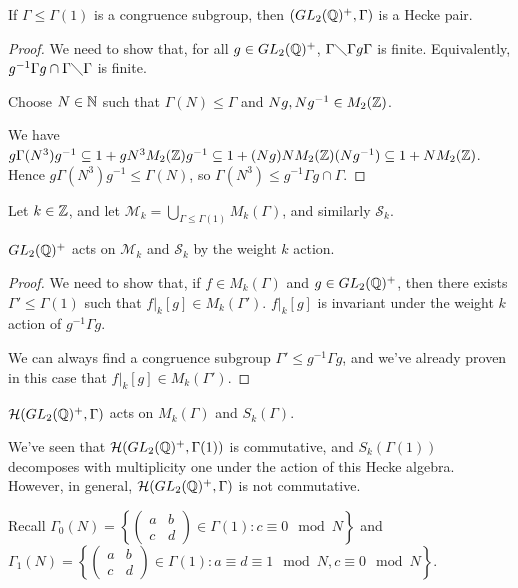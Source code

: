 \documentclass[10pt,a4paper]{article}
\begin{document}
\begin{lemma}
  If $\Gamma \leq \Gamma(1)$ is a congruence subgroup, then $(GL_2(\mathbb{Q})^+, \Gamma)$ is a Hecke pair.
\end{lemma}
\begin{proof}
  We need to show that, for all $g \in GL_2(\mathbb{Q})^+$, $\Gamma \diagdown \Gamma g\Gamma$ is finite. Equivalently, $g^{-1}\Gamma g \cap \Gamma \diagdown \Gamma$ is finite.

  Choose $N \in \mathbb{N}$ such that $\Gamma(N) \leq \Gamma$ and $Ng, Ng^{-1} \in M_2(\mathbb{Z})$.

  We have $g \Gamma(N^3) g^{-1} \subseteq 1 + gN^3 M_2(\mathbb{Z})g^{-1} \subseteq 1 + (Ng)N M_2(\mathbb{Z}) (Ng^{-1}) \subseteq 1 + NM_2(\mathbb{Z})$. Hence $g\Gamma(N^3)g^{-1} \leq \Gamma(N)$, so $\Gamma(N^3) \leq g^{-1}\Gamma g \cap \Gamma$.
\end{proof}
\begin{definition}
  Let $k \in \mathbb{Z}$, and let $\mathcal{M}_k = \bigcup_{\Gamma\leq \Gamma(1)}M_k(\Gamma)$, and similarly $\mathcal{S}_k$.
\end{definition}
\begin{proposition}
  $GL_2(\mathbb{Q})^+$ acts on $\mathcal{M}_k$ and $\mathcal{S}_k$ by the weight $k$ action.
\end{proposition}
\begin{proof}
  We need to show that, if $f \in M_k(\Gamma)$ and $g \in GL_2(\mathbb{Q})^+$, then there exists $\Gamma' \leq \Gamma(1)$ such that $f|_k[g] \in M_k(\Gamma')$. $f|_k[g]$ is invariant under the weight $k$ action of $g^{-1}\Gamma g$.

  We can always find a congruence subgroup $\Gamma' \leq g^{-1}\Gamma g$, and we've already proven in this case that $f|_{k}[g] \in M_k(\Gamma')$.
\end{proof}
\begin{corollary}
  $\mathcal{H}(GL_2(\mathbb{Q})^+, \Gamma)$ acts on $M_k(\Gamma)$ and $S_k(\Gamma)$.
\end{corollary}
We've seen that $\mathcal{H}(GL_2(\mathbb{Q})^+, \Gamma(1))$ is commutative, and $S_k(\Gamma(1))$ decomposes with multiplicity one under the action of this Hecke algebra. However, in general, $\mathcal{H}(GL_2(\mathbb{Q})^+, \Gamma)$ is not commutative.

Recall $\Gamma_0(N) = \left\{\begin{pmatrix}a&b\\c&d\end{pmatrix}\in \Gamma(1): c \equiv 0 \mod N\right\}$ and $\Gamma_1(N) = \left\{\begin{pmatrix}a&b\\c&d\end{pmatrix}\in \Gamma(1): a \equiv d \equiv 1 \mod N, c \equiv 0 \mod N\right\}$.
\end{document}
